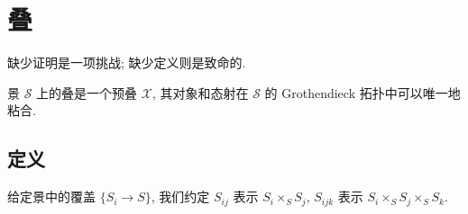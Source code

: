\section{叠}\label{src:3.5}
\begin{epigraph}
缺少证明是一项挑战; 缺少定义则是致命的.
\end{epigraph}
景 $\mathcal S$ 上的叠是一个预叠 $\mathcal X$, 其对象和态射在 $\mathcal S$ 的 Grothendieck 拓扑中可以唯一地粘合.

\subsection{定义}\label{src:3.5.1-subsection}
给定景中的覆盖 $\{S_i\to S\}$, 我们约定 $S_{ij}$ 表示 $S_i\times_S S_j$, $S_{ijk}$ 表示 $S_i\times_S S_j\times_S S_k$.
